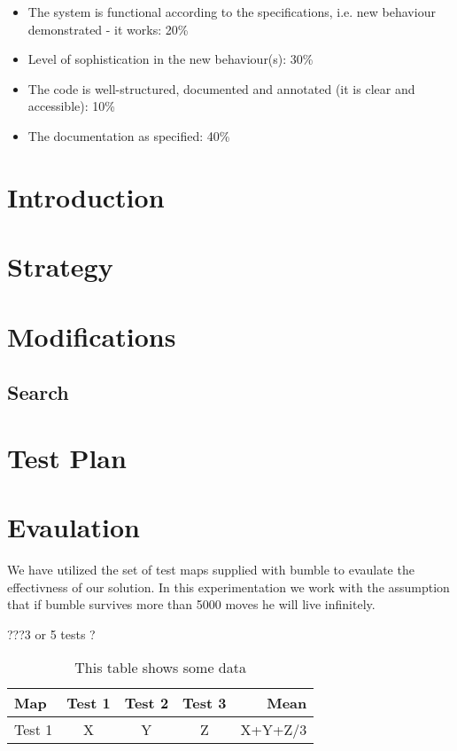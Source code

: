 \documentclass[a4paper,oneside]{report}
\begin{document}
\begin{itemize}
\item The system is functional according to the specifications, i.e. new behaviour demonstrated - it works: 20\%
\item Level of sophistication in the new behaviour(s): 30\%
\item The code is well-structured, documented and annotated (it is clear and accessible): 10\%
\item The documentation as specified: 40\%
\end{itemize}





\section{Introduction}

\section{Strategy}

\section{Modifications}

	\subsection{Search}
	
		
	

\section{Test Plan}


\section{Evaulation}

	We have utilized the set of test maps supplied with bumble to evaulate the effectivness of our solution. In this experimentation we work with the assumption that if bumble survives more than 5000 moves he will live infinitely.
	
	???3 or 5 tests ? 
	
	
	\begin{table}[position specifier]
		\centering
		\begin{tabular}{| l | c | c | c | r |}
		\hline
			Map & Test 1 & Test 2 & Test 3 & Mean \\ \hline
			Test 1 &  X & Y & Z & X+Y+Z/3 \\ \hline
		\end{tabular}
		\caption{This table shows some data}
		\label{tab:myfirsttable}
	\end{table}
	
\end{document}

